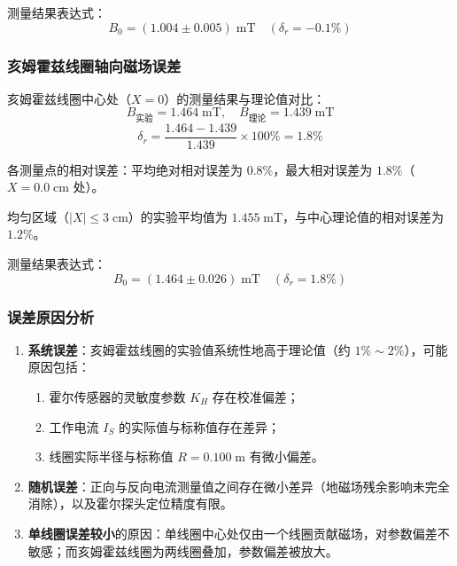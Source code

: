 \documentclass{Phyport}
\begin{document}
测量结果表达式：
\begin{equation*}
    B_0 = (1.004 \pm 0.005)\;\text{mT} \quad (\delta_r = -0.1\%)
\end{equation*}

\subsubsection{亥姆霍兹线圈轴向磁场误差}

亥姆霍兹线圈中心处（$X = 0$）的测量结果与理论值对比：
\begin{equation*}
    B_{\text{实验}} = 1.464\;\text{mT}, \quad B_{\text{理论}} = 1.439\;\text{mT}
\end{equation*}
\begin{equation*}
    \delta_r = \frac{1.464 - 1.439}{1.439} \times 100\% = 1.8\%
\end{equation*}

各测量点的相对误差：平均绝对相对误差为 $0.8\%$，最大相对误差为 $1.8\%$（$X = 0.0\;\text{cm}$ 处）。

均匀区域（$|X| \leq 3\;\text{cm}$）的实验平均值为 $1.455\;\text{mT}$，与中心理论值的相对误差为 $1.2\%$。

测量结果表达式：
\begin{equation*}
    B_0 = (1.464 \pm 0.026)\;\text{mT} \quad (\delta_r = 1.8\%)
\end{equation*}

\subsubsection{误差原因分析}

\begin{enumerate}
    \item \textbf{系统误差}：亥姆霍兹线圈的实验值系统性地高于理论值（约 $1\% \sim 2\%$），可能原因包括：
    \begin{enumerate}
        \item 霍尔传感器的灵敏度参数 $K_H$ 存在校准偏差；
        \item 工作电流 $I_S$ 的实际值与标称值存在差异；
        \item 线圈实际半径与标称值 $R = 0.100\;\text{m}$ 有微小偏差。
    \end{enumerate}
    \item \textbf{随机误差}：正向与反向电流测量值之间存在微小差异（地磁场残余影响未完全消除），以及霍尔探头定位精度有限。
    \item \textbf{单线圈误差较小}的原因：单线圈中心处仅由一个线圈贡献磁场，对参数偏差不敏感；而亥姆霍兹线圈为两线圈叠加，参数偏差被放大。
\end{enumerate}
\end{document}
